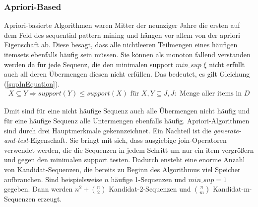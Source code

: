 \subsubsection{Apriori-Based}

Apriori-basierte Algorithmen waren Mitter der neunziger Jahre die ersten auf dem Feld des sequential pattern mining und hängen vor allem von der apriori Eigenschaft ab. Diese besagt, dass alle nichtleeren Teilmengen eines häufigen itemsets ebenfalls häufig sein müssen. Sie können als monoton fallend verstanden werden da für jede Sequenz, die den minimalen support $min\_sup$ $\xi$ nicht erfüllt auch all deren Übermengen diesen nicht erfüllen. Das bedeutet, es gilt Gleichung (\ref{supInEquation}).
\begin{align}
	X \subseteq Y \Rightarrow support(Y) \leq support(X) \text{  für  } X,Y \subseteq J, J: \text{  Menge aller items in  } D \label{supInEquation}
\end{align}

Dmit sind für eine nicht häufige Sequenz auch alle Übermengen nicht häufig und für eine häufige Sequenz alle Untermengen ebenfalls häufig. Apriori-Algorithmen sind durch drei Hauptmerkmale gekennzeichnet.
Ein Nachteil ist die \textit{generate-and-test}-Eigenschaft. Sie bringt mit sich, dass ausgiebige join-Operatoren verwendet werden, die die Sequenzen in jedem Schritt um nur ein item vergrößern und gegen den minimalen support testen. Dadurch ensteht eine enorme Anzahl von Kandidat-Sequenzen, die bereits zu Beginn des Algorithmus viel Speicher aufbrauchen. Sind beispielsweise $n$ häufige 1-Sequenzen und $min\_sup=1$ gegeben. Dann werden $n^2+\binom{n}{2}$  Kandidat-2-Sequenzen und $\binom{n}{m}$ Kandidat-m-Sequenzen erzeugt.

